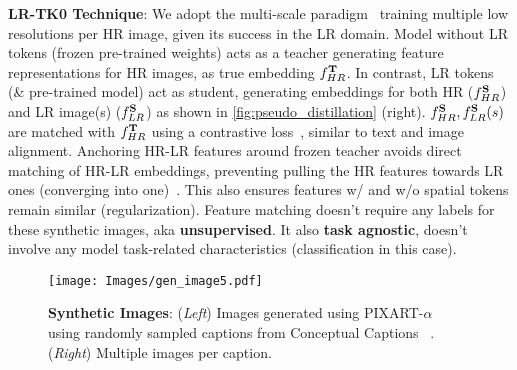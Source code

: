 \noindent \textbf{LR-TK0 Technique}:
We adopt the multi-scale paradigm~\citep{chen2019learning} \ie training multiple low resolutions per HR image, given its success in the LR domain.
Model without LR tokens (frozen pre-trained weights) acts as a teacher generating feature representations for HR images, as true embedding $f^\text{\textbf{T}}_{HR}$. 
In contrast, LR tokens (\& pre-trained model) act as student, generating embeddings for both HR ($f^\text{\textbf{S}}_{HR}$) and LR image(s) ($f^\text{\textbf{S}}_{LR}$) as shown in  \cref{fig:pseudo_distillation} (right).
$f^\text{\textbf{S}}_{HR},f^\text{\textbf{S}}_{LR}(s)$ are matched with $f^\text{\textbf{T}}_{HR}$ using a contrastive loss~\citep{radford2021learning}, similar to text and image alignment. 
Anchoring HR-LR features around frozen teacher avoids direct matching of HR-LR embeddings, preventing pulling the HR features towards LR ones (converging into one)~\citep{9137263}. 
This also ensures features w/ and w/o spatial tokens remain similar (regularization). 
Feature matching doesn't require any labels for these synthetic images, aka \textbf{unsupervised}.
It also \textbf{task agnostic}, \ie doesn't involve any model task-related characteristics (classification in this case). 
\vspace{-15pt}
  

\begin{figure}[!t]
\centering
{}
\hfill
\subfloat
{
\texttt{[image: Images/gen\_image5.pdf]}
\vspace{-3pt}
}
\caption{ 
\textbf{Synthetic Images}: (\textit{Left}) Images generated using PIXART-$\alpha$~ using randomly sampled captions from Conceptual Captions ~.
(\textit{Right}) Multiple images per caption.
}
\label{fig:Sr_images}
\vspace{-5pt}
\end{figure}


